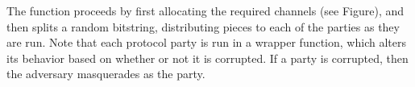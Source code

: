 

The function proceeds by first allocating the required channels (see Figure),
and then splits a random bitstring, distributing pieces to each of the parties
as they are run.  Note that each protocol party is run in a \textsf{wrapper}
function, which alters its behavior based on whether or not it is corrupted. If
a party is corrupted, then the adversary masquerades as the party.


